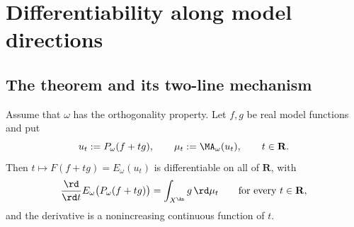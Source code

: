 \section{Differentiability along model directions}
\label{sec:ch27-model-directions}

\subsection{The theorem and its two-line mechanism}
\label{sec:ch27-model-mechanism}

\begin{theorem}
\label{thm:ch27-model-direction-differentiability}
Assume that \(\omega\) has the orthogonality property.  Let \(f,g\) be real
model functions and put
\[
 u_t:=P_\omega(f+tg),
 \qquad \mu_t:=\MA_\omega(u_t),
 \qquad t\in\mathbf R .
\]
Then \(t\mapsto F(f+tg)=E_\omega(u_t)\) is differentiable on all of
\(\mathbf R\), with
\begin{equation}\label{eq:ch27-model-direction-derivative}
 \frac{\rd}{\rd t}E_\omega\bigl(P_\omega(f+tg)\bigr)
 =\int_{X^{\An}}g\,\rd\mu_t
 \qquad\text{for every }t\in\mathbf R,
\end{equation}
and the derivative is a nonincreasing continuous function of \(t\).
\end{theorem}

